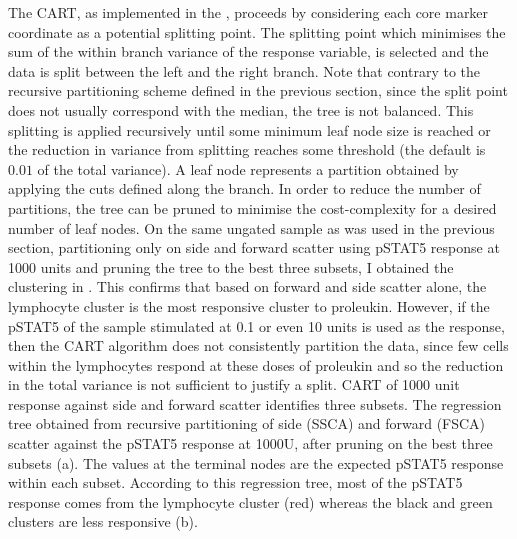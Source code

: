 The \gls{CART}, as implemented in the , proceeds by considering each core marker coordinate as a potential splitting point.
The splitting point which minimises the sum of the within branch variance of the response variable,
is selected and the data is split between the left and the right branch.
Note that contrary to the recursive partitioning scheme defined in the previous section, since the split point does not usually correspond with the median, the tree is not balanced.
This splitting is applied recursively until some minimum leaf node size is reached
or the reduction in variance from splitting reaches some threshold (the default is $0.01$ of the total variance).
A leaf node represents a partition obtained by applying the cuts defined along the branch.
In order to reduce the number of partitions, the tree can be pruned to minimise the cost-complexity
for a desired number of leaf nodes.
On the same ungated sample as was used in the previous section, partitioning only on side and forward scatter using pSTAT5 response
at 1000 units and pruning the tree to the best three subsets,
I obtained the clustering in .
This confirms that based on forward and side scatter alone, the lymphocyte cluster is the most responsive cluster to proleukin.
However, if the pSTAT5 of the sample stimulated at 0.1 or even 10 units is used as the response, then the \gls{CART} algorithm
does not consistently partition the data, since few cells within the lymphocytes respond at these doses
of proleukin and so the reduction in the total variance is not sufficient to justify a split.
{ \gls{CART} of 1000 unit response against side and forward scatter identifies three subsets. }
{
The regression tree obtained from recursive partitioning of side (SSCA) and forward (FSCA) scatter against the pSTAT5 response at 1000U,
after pruning on the best three subsets (a).
The values at the terminal nodes are the expected pSTAT5 response within each subset.
According to this regression tree, most of the pSTAT5 response comes from the lymphocyte cluster (red) whereas
the black and green clusters are less responsive (b).
} 


